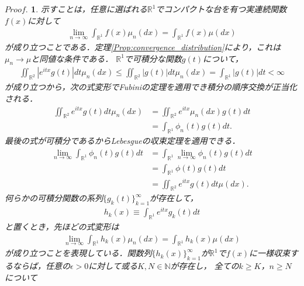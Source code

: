 \documentclass[a4j,papersize,disablejfam,slide,14pt]{jsarticle}
\newtheorem{Proof}{$Proof.$}
\def\exp#1{e^{#1}} %
\begin{document}
    \begin{Proof}
    	示すことは，任意に選ばれる$\mathbb{R}^1$でコンパクトな台を有つ実連続関数$f(x)$に対して
        \begin{align}
        	\lim_{n \to \infty} \int_{\mathbb{R}^1} f(x) \mu_n(dx) = \int_{\mathbb{R}^1} f(x) \mu(dx)
        \end{align}
        が成り立つことである．定理{\ref{Prop:convergence_distribution}}により，これは$\mu_n \to \mu$と同値な条件である．
    	$\mathbb{R}^1$で可積分な関数$g(t)$について，
        \begin{align}
        	\iint_{\mathbb{R}^2} \left| \exp{itx} g(t) \right| dt \mu_n(dx) \leq \iint_{\mathbb{R}^2} \left| g(t) \right| dt \mu_n(dx) = \int_{\mathbb{R}^1} \left| g(t) \right| dt < \infty
        \end{align}
        が成り立つから，次の式変形で{\rm Fubini}の定理を適用でき積分の順序交換が正当化される．
        \begin{align}
        	\iint_{\mathbb{R}^2} \exp{itx} g(t) dt \mu_n(dx) &= \iint_{\mathbb{R}^2} \exp{itx} \mu_n(dx) g(t) dt \\
        	&= \int_{\mathbb{R}^1} \phi_n(t) g(t) dt.
        \end{align}
        最後の式が可積分であるから{\rm Lebesgue}の収束定理を適用できる．
        \begin{align}
        	\lim_{n \to \infty} \int_{\mathbb{R}^1} \phi_n(t) g(t) dt &= \int_{\mathbb{R}^1} \lim_{n \to \infty} \phi_n(t) g(t) dt \\
            &= \int_{\mathbb{R}^1} \phi(t) g(t) dt \\
            &= \iint_{\mathbb{R}^2} \exp{itx} g(t) dt \mu(dx).
        \end{align}
        何らかの可積分関数の系列$\{ g_k(t) \}_{k=1}^{\infty}$が存在して，
        \begin{align}
        	h_k(x) \equiv \int_{\mathbb{R}^1} \exp{itx} g_k(t) dt
        \end{align}
        と置くとき，先ほどの式変形は
        \begin{align}
        	\lim_{n \to \infty} \int_{\mathbb{R}^1} h_k(x) \mu_n(dx) = \int_{\mathbb{R}^1} h_k(x) \mu(dx)
        \end{align}
        が成り立つことを表現している．関数列$\{ h_k(x) \}_{k=1}^{\infty}$が$\mathbb{R}^1$で$f(x)$に一様収束するならば，任意の$\epsilon > 0$に対して或る$K,N \in \mathbb{N}$が存在し，
        全ての$k \geq K$，$n \geq N$について
        \begin{align}

\end{align}
\end{Proof}
\end{document}
